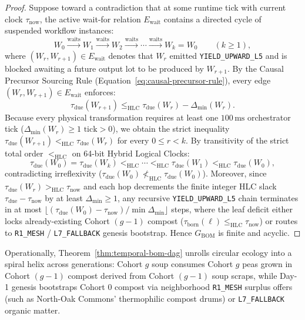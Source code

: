 \begin{proof}
Suppose toward a contradiction that at some runtime tick with current clock $\tau_{\mathrm{now}}$, the
active wait-for relation $E_{\mathrm{wait}}$ contains a directed cycle of suspended workflow instances:
\[
W_0 \xrightarrow{\text{waits}} W_1 \xrightarrow{\text{waits}} W_2 \xrightarrow{\text{waits}} \cdots \xrightarrow{\text{waits}} W_k = W_0 \qquad (k \ge 1),
\]
where $(W_r, W_{r+1}) \in E_{\mathrm{wait}}$ denotes that $W_r$ emitted \texttt{YIELD\_UPWARD\_L5} and is
blocked awaiting a future output lot to be produced by $W_{r+1}$. By the Causal Precursor Sourcing Rule
(Equation~\ref{eq:causal-precursor-rule}), every edge $(W_r, W_{r+1}) \in E_{\mathrm{wait}}$ enforces:
\[
\tau_{\mathrm{due}}(W_{r+1}) \le_{\mathrm{HLC}} \tau_{\mathrm{due}}(W_r) - \Delta_{\min}(W_r).
\]
Because every physical transformation requires at least one $100\,\mathrm{ms}$ orchestrator tick
($\Delta_{\min}(W_r) \ge 1\text{ tick} > 0$), we obtain the strict inequality
$\tau_{\mathrm{due}}(W_{r+1}) <_{\mathrm{HLC}} \tau_{\mathrm{due}}(W_r)$ for every $0 \le r < k$. By
transitivity of the strict total order $<_{\mathrm{HLC}}$ on 64-bit Hybrid Logical Clocks:
\[
\tau_{\mathrm{due}}(W_0) = \tau_{\mathrm{due}}(W_k) <_{\mathrm{HLC}} \cdots <_{\mathrm{HLC}} \tau_{\mathrm{due}}(W_1) <_{\mathrm{HLC}} \tau_{\mathrm{due}}(W_0),
\]
contradicting irreflexivity ($\tau_{\mathrm{due}}(W_0) \not<_{\mathrm{HLC}} \tau_{\mathrm{due}}(W_0)$).
Moreover, since $\tau_{\mathrm{due}}(W_r) >_{\mathrm{HLC}} \tau_{\mathrm{now}}$ and each hop decrements
the finite integer HLC slack $\tau_{\mathrm{due}} - \tau_{\mathrm{now}}$ by at least $\Delta_{\min} \ge
1$, any recursive \texttt{YIELD\_UPWARD\_L5} chain terminates in at most $\lfloor
(\tau_{\mathrm{due}}(W_0) - \tau_{\mathrm{now}}) / \min \Delta_{\min} \rfloor$ steps, where the leaf
deficit either locks already-existing Cohort $(g-1)$ compost ($\tau_{\mathrm{born}}(\ell)
\le_{\mathrm{HLC}} \tau_{\mathrm{now}}$) or routes to \texttt{R1\_MESH} / \texttt{L7\_FALLBACK} genesis
bootstrap. Hence $G_{\mathrm{BOM}}$ is finite and acyclic.
\end{proof}

Operationally, Theorem~\ref{thm:temporal-bom-dag} unrolls circular ecology into a spiral helix across
generations: Cohort $g$ soup consumes Cohort $g$ peas grown in Cohort $(g-1)$ compost derived from Cohort
$(g-1)$ soup scraps, while Day-1 genesis bootstraps Cohort $0$ compost via neighborhood \texttt{R1\_MESH}
surplus offers (such as North-Oak Commons' thermophilic compost drums) or \texttt{L7\_FALLBACK} organic
matter.

